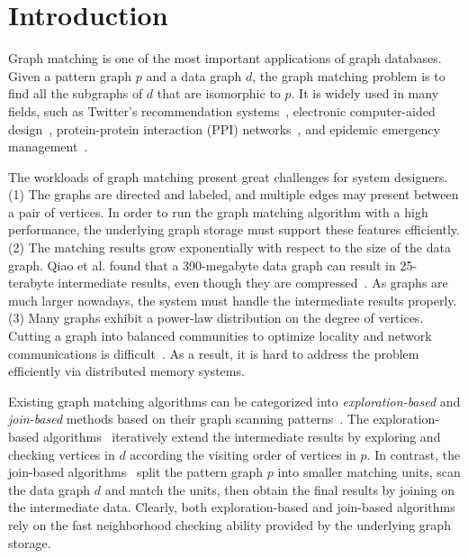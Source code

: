 \section{Introduction}
Graph matching is one of the most important applications of graph databases.
Given a pattern graph $p$ and a data graph $d$, the graph matching problem is to find all the subgraphs of $d$ that are isomorphic to $p$.
It is widely used in many fields,
such as Twitter's recommendation systems~\cite{DBLP:journals/pvldb/GuptaSGGZLL14,DBLP:journals/pvldb/SharmaJBLL16},
electronic computer-aided design~\cite{DBLP:conf/dac/OhlrichEGS93},
protein-protein interaction (PPI) networks~\cite{milenkovic2008uncovering},
and epidemic emergency management~\cite{info:doi/10.2196/26836}.

The workloads of graph matching present great challenges for system designers.
(1) The graphs are directed and labeled, and multiple edges may present between a pair of vertices.
In order to run the graph matching algorithm with a high performance, the underlying graph storage must support these features efficiently.
(2) The matching results grow exponentially with respect to the size of the data graph.
Qiao et al. found that a 390-megabyte data graph can result in 25-terabyte intermediate results, even though they are compressed~\cite{DBLP:journals/pvldb/QiaoZC17}.
As graphs are much larger nowadays, the system must handle the intermediate results properly.
(3) Many graphs exhibit a power-law distribution on the degree of vertices.
Cutting a graph into balanced communities to optimize locality and network communications is difficult~\cite{DBLP:journals/im/LeskovecLDM09}.
As a result, it is hard to address the problem efficiently via distributed memory systems.

Existing graph matching algorithms can be categorized into \emph{exploration-based} and \emph{join-based} methods based on their graph scanning patterns~\cite{DBLP:journals/pvldb/SunSC0H20}.
The exploration-based algorithms~\cite{DBLP:journals/jacm/Ullmann76,DBLP:journals/pami/CordellaFSV04,DBLP:journals/pvldb/ShangZLY08,DBLP:conf/sigmod/HeS08,DBLP:conf/sigmod/HanLL13,DBLP:journals/pvldb/ZhaoH10,DBLP:journals/pvldb/LeeHKL12}
iteratively extend the intermediate results by exploring and checking vertices in $d$ according the visiting order of vertices in $p$.
In contrast, the join-based algorithms~\cite{DBLP:journals/pvldb/LaiQLC15,DBLP:journals/pvldb/QiaoZC17,DBLP:journals/pvldb/SunWWSL12,DBLP:journals/pvldb/MhedhbiS19,DBLP:journals/pvldb/LinMPS16,DBLP:journals/pvldb/AmmarMSJ18} split the pattern graph $p$ into smaller matching units, scan the data graph $d$ and match the units, then obtain the final results by joining on the intermediate data.
Clearly, both exploration-based and join-based algorithms rely on the fast neighborhood checking ability provided by the underlying graph storage.

